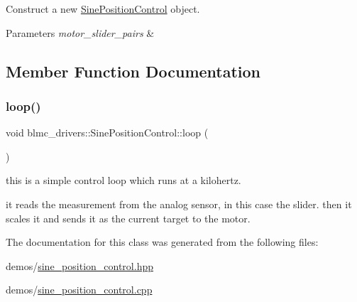 Construct a new \hyperlink{classblmc__drivers_1_1SinePositionControl}{Sine\+Position\+Control} object. 


\begin{DoxyParams}{Parameters}
{\em motor\+\_\+slider\+\_\+pairs} & \\
\hline
\end{DoxyParams}


\subsection{Member Function Documentation}
\mbox{\label{classblmc__drivers_1_1SinePositionControl_a1e5ab43762ca2511a6badc7065f47e4b}} 
\subsubsection{\texorpdfstring{loop()}{loop()}}
{\footnotesize\ttfamily void blmc\+\_\+drivers\+::\+Sine\+Position\+Control\+::loop (\begin{DoxyParamCaption}{ }\end{DoxyParamCaption})\hspace{0.3cm}{\ttfamily [private]}}



this is a simple control loop which runs at a kilohertz. 

it reads the measurement from the analog sensor, in this case the slider. then it scales it and sends it as the current target to the motor. 

The documentation for this class was generated from the following files\+:\begin{DoxyCompactItemize}
\item 
demos/\hyperlink{sine__position__control_8hpp}{sine\+\_\+position\+\_\+control.\+hpp}\item 
demos/\hyperlink{sine__position__control_8cpp}{sine\+\_\+position\+\_\+control.\+cpp}\end{DoxyCompactItemize}
